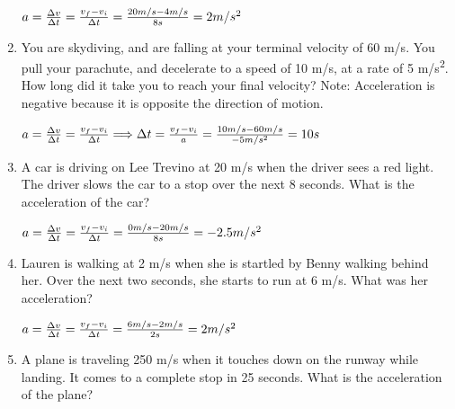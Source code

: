 \documentclass[letterpaper, 12pt]{article}
\begin{document}
\begin{enumerate}
	\color{red}
	\begin{center} $ a = \frac{\Delta v}{\Delta t } = \frac{v_f - v_i}{\Delta t} = \frac{20m/s-4m/s}{8s} = 2 m/s^2
		\vspace{0.15in} $
	\end{center}
	\color{black}

\item You are skydiving, and are falling at your terminal velocity of 60 m/s.  You pull your parachute, and decelerate to a speed of 10 m/s, at a rate of 5 m/s\textsuperscript{2}.  How long did it take you to reach your final velocity? 	\color{red} Note: Acceleration is negative because it is opposite the direction of motion. 
		

	\begin{center} $ a = \frac{\Delta v}{\Delta t } = \frac{v_f - v_i}{\Delta t} \Longrightarrow \Delta t = \frac{v_f - v_i}{a} = \frac{10m/s-60m/s}{-5m/s^2} = 10s
		\vspace{0.15in} $
	\end{center}
	\color{black}


\item A car is driving on Lee Trevino at 20 m/s when the driver sees a red light.  The driver slows the car to a stop over the next 8 seconds.  What is the acceleration of the car?

		\vspace{0.15in}
		\color{red}
	\begin{center} $ a = \frac{\Delta v}{\Delta t } = \frac{v_f - v_i}{\Delta t} = \frac{0m/s-20m/s}{8s} = -2.5 m/s^2
		\vspace{0.95in} $
	\end{center}
	\color{black}



\item Lauren is walking at 2 m/s when she is startled by Benny walking behind her. Over the next two seconds, she starts to run at 6 m/s. What was her acceleration?
	
	\color{red}
	\begin{center} $ a = \frac{\Delta v}{\Delta t } = \frac{v_f - v_i}{\Delta t} = \frac{6m/s-2m/s}{2s} = 2 m/s^2
		\vspace{0.15in} $
	\end{center}
	\color{black}

\item A plane is traveling 250 m/s when it touches down on the runway while landing.  It comes to a complete stop in 25 seconds.  What is the acceleration of the plane?


\end{enumerate}
\end{document}
